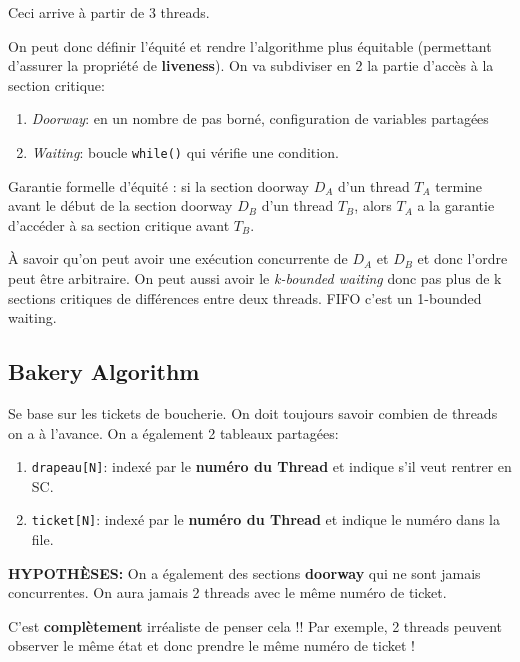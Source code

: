 Ceci arrive à partir de 3 threads.

On peut donc définir l'équité et rendre l'algorithme plus équitable
(permettant d'assurer la propriété de \textbf{liveness}). On va
subdiviser en 2 la partie d'accès à la section critique:

\begin{enumerate}
\def\labelenumi{\arabic{enumi}.}
\tightlist
\item
  \emph{Doorway}: en un nombre de pas borné, configuration de variables
  partagées
\item
  \emph{Waiting}: boucle \texttt{while()} qui vérifie une condition.
\end{enumerate}

Garantie formelle d'équité : si la section doorway \(D_A\) d'un thread
\(T_A\) termine avant le début de la section doorway \(D_B\) d'un thread
\(T_B\), alors \(T_A\) a la garantie d'accéder à sa section critique
avant \(T_B\).

À savoir qu'on peut avoir une exécution concurrente de \(D_A\) et
\(D_B\) et donc l'ordre peut être arbitraire. On peut aussi avoir le
\emph{k-bounded waiting} donc pas plus de k sections critiques de
différences entre deux threads. FIFO c'est un 1-bounded waiting.

\subsection{Bakery Algorithm}\label{bakery-algorithm}

Se base sur les tickets de boucherie. On doit toujours savoir combien de
threads on a à l'avance. On a également 2 tableaux partagées:

\begin{enumerate}
\def\labelenumi{\arabic{enumi}.}
\tightlist
\item
  \texttt{drapeau{[}N{]}}: indexé par le \textbf{numéro du Thread} et
  indique s'il veut rentrer en SC.
\item
  \texttt{ticket{[}N{]}}: indexé par le \textbf{numéro du Thread} et
  indique le numéro dans la file.
\end{enumerate}

\textbf{HYPOTHÈSES:} On a également des sections \textbf{doorway} qui ne
sont jamais concurrentes. On aura jamais 2 threads avec le même numéro
de ticket.

C'est \textbf{complètement} irréaliste de penser cela !! Par exemple, 2
threads peuvent observer le même état et donc prendre le même numéro de
ticket !

